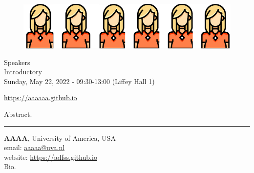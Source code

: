 \begin{center}
    \vspace{-0.5cm}
    \begin{figure}[h!]
      \includegraphics[width=\linewidth]{examples/handbook_coling25/tutorials/images/t2.png}
    \end{figure}
    \normalsize{Speakers}\\
    \large{Introductory}\\
    \large{Sunday, May 22, 2022 - 09:30-13:00 (Liffey Hall 1)}\\
    \par\bigskip
    \normalsize{\url{https://aaaaaa.github.io}}

\end{center}

Abstract.

\begin{center}
    \noindent\rule{200px}{1pt}
\end{center}

\noindent
\textbf{AAAA}, University of America, USA \\
email: \url{aaaaa@uva.nl} \\
website: \url{https://adfss.github.io} \\
Bio.\\